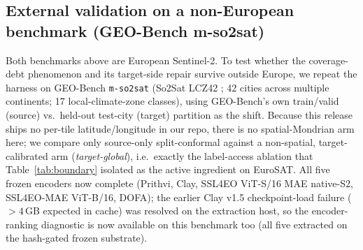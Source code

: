 \documentclass[11pt]{article}
\begin{document}
\subsection*{External validation on a non-European benchmark (GEO-Bench m-so2sat)}
Both benchmarks above are European Sentinel-2. To test whether the coverage-debt phenomenon and its
target-side repair survive outside Europe, we repeat the harness on GEO-Bench \citep{lacoste2023geobench}
\texttt{m-so2sat} (So2Sat LCZ42 \citep{zhu2020so2sat}; 42 cities across multiple continents; 17 local-climate-zone classes),
using GEO-Bench's own train/valid (source) vs.\ held-out test-city (target) partition as the shift. Because
this release ships no per-tile latitude/longitude in our repo, there is no spatial-Mondrian arm here;
we compare only source-only split-conformal against a non-spatial, target-calibrated arm
(\emph{target-global}), i.e.\ exactly the label-access ablation that Table~\ref{tab:boundary} isolated as the
active ingredient on EuroSAT. All five frozen encoders now complete (Prithvi, Clay, SSL4EO ViT-S/16 MAE
native-S2, SSL4EO-MAE ViT-B/16, DOFA); the earlier Clay v1.5 checkpoint-load failure ($>4$\,GB expected in
cache) was resolved on the extraction host, so the encoder-ranking diagnostic is now available on this
benchmark too (all five extracted on the hash-gated frozen substrate).
\end{document}
